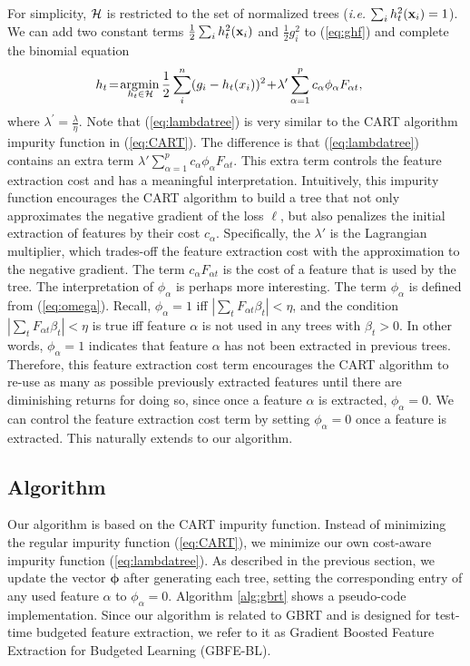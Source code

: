 For simplicity, ${\cal H}$ is restricted to the set of normalized trees (\emph{i.e.} $\sum_i h_t^2(\mathbf{x}_i) = 1$). We can add two constant terms $\frac{1}{2}\sum_i h_t^2(\mathbf{x}_i)$ and $\frac{1}{2}g_i^2$ to (\ref{eq:ghf}) and complete the binomial equation
\begin{align}
	h_t\!=\!\arg\!\min_{\hspace{-3ex}h_t\in{\cal H}} \frac{1}{2}\displaystyle\sum_i^n (g_i-h_t(x_i))^2 \!+\! \lambda' \sum_{\alpha=1}^p c_{\alpha} \phi_{\alpha} F_{\alpha t}, & \label{eq:lambdatree}
\end{align}
where $\lambda^\prime = \frac{\lambda}{\eta}$. Note that (\ref{eq:lambdatree}) is very similar to the CART algorithm impurity function in (\ref{eq:CART}). The difference is that (\ref{eq:lambdatree}) contains an extra term $\lambda' \sum_{\alpha=1}^p c_{\alpha} \phi_{\alpha} F_{\alpha t}$. This extra term controls the feature extraction cost and has a meaningful interpretation. Intuitively, this impurity function encourages the CART algorithm to build a tree that not only approximates the negative gradient of the loss $\ell$, but also penalizes the initial extraction of features by their cost $c_\alpha$. Specifically, the $\lambda'$ is the Lagrangian multiplier, which trades-off the feature extraction cost with the approximation to the negative gradient. The term $c_\alpha F_{\alpha t}$ is the cost of a feature that is used by the tree. The interpretation of $\phi_\alpha$ is perhaps more interesting. The term $\phi_\alpha$ is defined from (\ref{eq:omega}). Recall, $\phi_\alpha = 1$ iff $|\sum_t F_{\alpha t} \beta_t| < \eta$, and the condition $|\sum_t F_{\alpha t} \beta_t| < \eta$ is true iff feature $\alpha$ is not used in any trees with $\beta_t > 0$. In other words, $\phi_\alpha = 1$ indicates that feature $\alpha$ has not been extracted in previous trees. Therefore, this feature extraction cost term encourages the CART algorithm to re-use as many as possible previously extracted features until there are diminishing returns for doing so, since once a feature $\alpha$ is extracted, $\phi_\alpha = 0$.  We can control the feature extraction cost term by setting $\phi_\alpha = 0$ once a feature is extracted. This naturally extends to our algorithm.

\subsection{Algorithm}
Our algorithm is based on the CART impurity function. Instead of minimizing the regular impurity function (\ref{eq:CART}), we minimize our own cost-aware impurity function (\ref{eq:lambdatree}). %
As described in the previous section, we update the vector $\boldsymbol{\phi}$ after generating each tree, setting the corresponding entry of any used feature $\alpha$ to $\phi_\alpha = 0$. Algorithm \ref{alg:gbrt} shows a pseudo-code implementation. Since our algorithm is related to GBRT and is designed for test-time budgeted feature extraction, we refer to it as Gradient Boosted Feature Extraction for Budgeted Learning (GBFE-BL).

